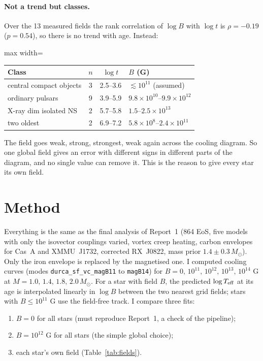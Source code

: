 \documentclass[11pt,a4paper]{article}
\newcommand{\Teff}{T_{\rm eff}}
\newcommand{\Msun}{M_\odot}
\begin{document}
\paragraph{Not a trend but classes.} Over the 13 measured fields the rank correlation of $\log B$ with $\log t$ is $\rho=-0.19$ ($p=0.54$), so there is no trend with age. Instead:
\begin{center}
\begin{adjustbox}{max width=\linewidth}
\begin{tabular}{lccl}
\toprule
Class & $n$ & $\log t$ & $B$ (G)\\
\midrule
central compact objects & 3 & 2.5--3.6 & $\lesssim10^{11}$ (assumed)\\
ordinary pulsars & 9 & 3.9--5.9 & $9.8\times10^{10}$--$9.9\times10^{12}$\\
X-ray dim isolated NS & 2 & 5.7--5.8 & $1.5$--$2.5\times10^{13}$\\
two oldest & 2 & 6.9--7.2 & $5.8\times10^{8}$--$2.4\times10^{11}$\\
\bottomrule
\end{tabular}
\end{adjustbox}
\end{center}
The field goes weak, strong, strongest, weak again across the cooling diagram. So one global field gives an error with different signs in different parts of the diagram, and no single value can remove it. This is the reason to give every star its own field.

\section{Method}
Everything is the same as the final analysis of Report~1 (864 EoS, five models with only the isovector couplings varied, vortex creep heating, carbon envelopes for Cas~A and XMMU~J1732, corrected RX~J0822, mass prior $1.4\pm0.3\,\Msun$). Only the iron envelope is replaced by the magnetised one. I computed cooling curves (modes \texttt{durca\_sf\_vc\_magB11} to \texttt{magB14}) for $B=0,\,10^{11},\,10^{12},\,10^{13},\,10^{14}$ G at $M=1.0,\,1.4,\,1.8,\,2.0\,\Msun$. For a star with field $B$, the predicted $\log\Teff$ at its age is interpolated linearly in $\log B$ between the two nearest grid fields; stars with $B\le10^{11}$ G use the field-free track. I compare three fits:
\begin{enumerate}
\item $B=0$ for all stars (must reproduce Report~1, a check of the pipeline);
\item $B=10^{12}$ G for all stars (the simple global choice);
\item each star's own field (Table~\ref{tab:fields}).
\end{enumerate}
\end{document}
